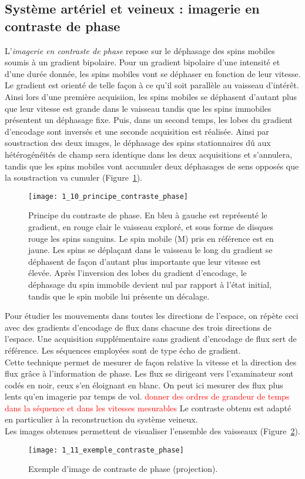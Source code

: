 \subsection{Système artériel et veineux : imagerie en contraste de phase}
L’{\em imagerie en contraste de phase} repose sur le déphasage des spins mobiles soumis à un gradient bipolaire. Pour un gradient bipolaire d’une intensité et d’une durée donnée, les spins mobiles vont se déphaser en fonction de leur vitesse.\\
Le gradient est orienté de telle façon à ce qu’il soit parallèle au vaisseau d’intérêt. Ainsi lors d’une première acquisiion, les spins mobiles se déphasent d’autant plus que leur vitesse est grande dans le vaisseau tandis que les spins immobiles présentent un déphasage fixe. Puis, dans un second temps, les lobes du gradient d’encodage sont inversés et une seconde acquisition est réalisée. Ainsi par soustraction des deux images, le déphasage des spins stationnaires dû aux hétérogénéités de champ sera identique dans les deux acquisitions et s’annulera, tandis que les spins mobiles vont accumuler deux déphasages de sens opposés que la soustraction va cumuler (Figure~\ref{fig:1_10_principe_contraste_phase}).\\
\begin{figure}[!t]
\centering
\texttt{[image: 1\_10\_principe\_contraste\_phase]}
\caption{Principe du contraste de phase. En bleu à gauche est représenté le gradient, en rouge clair le vaisseau exploré, et sous forme de disques rouge les spins sanguins. Le spin mobile (M) pris en référence est en jaune. Les spins se déplaçant dans le vaisseau le long du gradient se déphasent de façon d’autant plus importante que leur vitesse est élevée. Après l’inversion des lobes du gradient d’encodage, le déphasage du spin immobile devient nul par rapport à l’état initial, tandis que le spin mobile lui présente un décalage. }
\label{fig:1_10_principe_contraste_phase}	
\end{figure}
Pour étudier les mouvements dans toutes les directions de l’espace, on répète ceci avec des gradients d’encodage de flux dans chacune des trois directions de l’espace. Une acquisition supplémentaire sans gradient d’encodage de flux sert de référence. Les séquences employées sont de type écho de gradient.\\
Cette technique permet de mesurer de façon relative la vitesse et la direction des flux grâce à l’information de phase. Les flux se dirigeant vers l’examinateur sont codés en noir, ceux s’en éloignant en blanc. On peut ici mesurer des flux plus lents qu’en imagerie par temps de vol. \textcolor{red}{ donner des ordres de grandeur de temps dans la séquence et dans les vitesses mesurables} Le contraste obtenu est adapté en particulier à la reconstruction du système veineux.\\
Les images obtenues permettent de visualiser l’ensemble des vaisseaux (Figure~\ref{fig:1_11_exemple_contraste_phase}).
\begin{figure}[!t]
\centering
\texttt{[image: 1\_11\_exemple\_contraste\_phase]}
\caption{Exemple d'image de contraste de phase (projection).}
\label{fig:1_11_exemple_contraste_phase}	
\end{figure}

